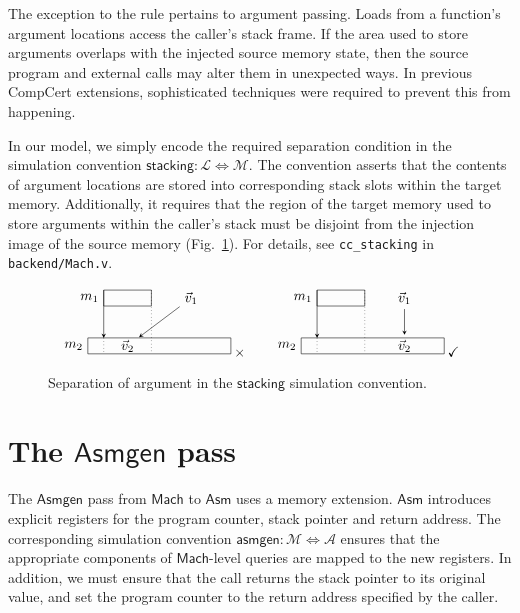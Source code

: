 \documentclass[draft,11pt]{report}
\newcommand{\kw}[1]{\ensuremath{ \mathsf{#1} }}
\begin{document}
The exception to the rule pertains to argument passing.
Loads from a function's argument locations
access the caller's stack frame.
If the area used to store arguments
overlaps with the injected source memory state,
then the source program and external calls
may alter them in unexpected ways.
In previous CompCert extensions,
sophisticated techniques were required
to prevent this from happening.

In our model,
we simply encode the required separation condition
in the simulation convention
$\kw{stacking} : \mathcal{L} \Leftrightarrow \mathcal{M}$.
The convention
asserts that the contents of argument locations
are stored into corresponding stack slots
within the target memory.
Additionally, it
requires that the region of the target memory
used to store arguments within the caller's stack
must be disjoint from the injection image of the source memory
(Fig.~\ref{fig:stacking}).
For details,
see \texttt{cc\_stacking} in \texttt{backend/Mach.v}.

\begin{figure}
\[
  \begin{tikzpicture}[scale=0.4,>=stealth]
    \draw ( 1,3) rectangle +(3,1); \node[left] at (1,3.5) {$m_1$};
    \draw ( 0,0) rectangle +(9,1); \node[left] at (0,0.5) {$m_2$};
    \node (V1) at (6.5,3.5) {$\vec{v}_1$};
    \node (V2) at (2.5,0.5) {$\vec{v}_2$};
    \draw[->] (1,4) -- (1,1); \draw[dotted] (1,1) -- (1,0); \draw[dotted] (4,4) -- (4,0);
    \draw[->] (V1) -- (V2);
  \end{tikzpicture}
  \:{\times}
  \qquad
  \begin{tikzpicture}[scale=0.4,>=stealth]
    \draw ( 1,3) rectangle +(3,1); \node[left] at (1,3.5) {$m_1$};
    \draw ( 0,0) rectangle +(9,1); \node[left] at (0,0.5) {$m_2$};
    \node (V1) at (6.5,3.5) {$\vec{v}_1$};
    \node (V2) at (6.5,0.5) {$\vec{v}_2$};
    \draw[->] (1,4) -- (1,1); \draw[dotted] (1,1) -- (1,0); \draw[dotted] (4,4) -- (4,0);
    \draw[->] (V1) -- (V2);
  \end{tikzpicture}
  \:{\checkmark}
\]
  \caption{Separation of argument
    in the \kw{stacking} simulation convention.}
  \label{fig:stacking}
\end{figure}


\section{The \kw{Asmgen} pass} \label{sec:asmgen} %

The \kw{Asmgen} pass from \kw{Mach} to \kw{Asm}
uses a memory extension.
\kw{Asm} introduces explicit registers for the
program counter, stack pointer and return address.
The corresponding simulation convention
$\kw{asmgen} : \mathcal{M} \Leftrightarrow \mathcal{A}$
ensures that the appropriate components of
\kw{Mach}-level queries are mapped to the new registers.
In addition,
we must ensure that the call returns the stack pointer
to its original value,
and set the program counter to the return address
specified by the caller.
\end{document}
